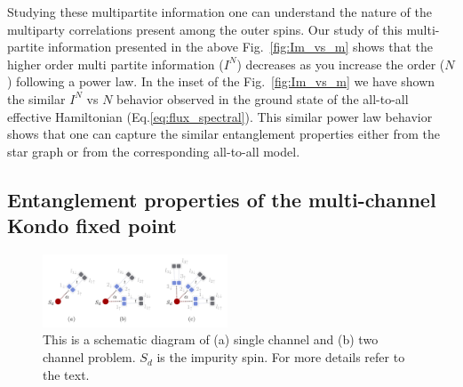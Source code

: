 \documentclass[reprint,prb,superscriptaddress]{revtex4-2}
\begin{document}
\noindent Studying these multipartite information one can understand the nature of the multiparty correlations present among the outer spins. Our study of this multi-partite information presented in the above Fig.~\eqref{fig:Im_vs_m} shows that the higher order multi partite information ($I^N$) decreases as you increase the order ($N$) following a power law. In the inset of the Fig.~\ref{fig:Im_vs_m} we have shown the similar $I^N$ vs $N$ behavior observed in the ground state of the all-to-all effective Hamiltonian (Eq.\ref{eq:flux_spectral}). This similar power law behavior shows that one can capture the similar entanglement properties either from the star graph or from the corresponding all-to-all model.

\subsection{Entanglement properties of the multi-channel Kondo fixed point}
\label{sec:EE_excitation}

\begin{figure}[!htpb]
\includegraphics[width=0.49\textwidth]{plt/hopping_fock_states}
\caption{This is a schematic diagram of (a) single channel and (b) two channel problem. $S_d$ is the impurity spin. For more details refer to the text.}
\label{fig:schematic_hopping}
\end{figure}
\end{document}
